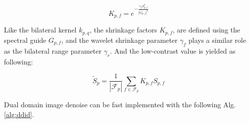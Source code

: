 \begin{equation}
\label{eq:did_kpf}
K_{p,f}=e^{-\frac{\gamma_{f}\sigma_{p,f}^2}{\left| G_{p,f} \right|^2}}
\end{equation}

Like the bilateral kernel $k_{p,q}$, the shrinkage factors $K_{p,f}$, are defined using the spectral guide $G_{p,f}$, and the wavelet shrinkage parameter $\gamma_{f}$ plays a similar role as the bilateral range parameter $\gamma_{r}$. And the low-contrast value is yielded as following:

\begin{equation}
    \label{eq:did_tspf}
    \tilde{S}_{p}=\frac{1}{\left| \mathscr{F}_{p} \right|}\sum_{f\in \mathscr{F}_{p}}{ K_{p,f}S_{p,f}}
\end{equation}

Dual domain image denoise can be fast implemented with the following Alg. \ref{alg:ddid}.

